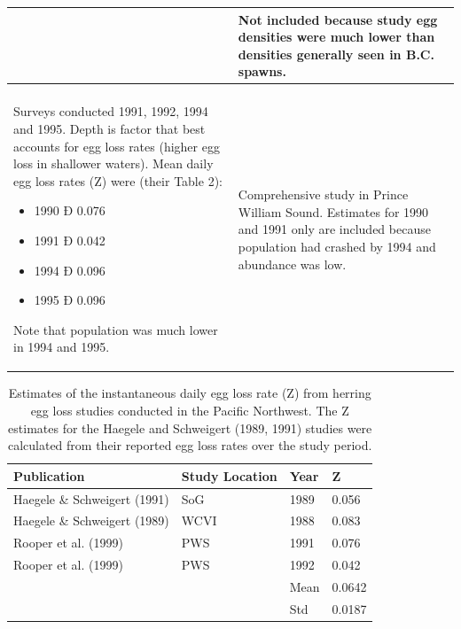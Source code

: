 \begin{table}[htdp]
\begin{center}
\begin{tabular}{|p{}|p{}|}
&
Not included because study egg densities were much lower than densities generally seen in B.C. spawns.\\
\hline
\cite{rooper1999habitat}& \\
Surveys conducted 1991, 1992, 1994 and 1995.  Depth is factor that best accounts for egg loss rates (higher egg loss in shallower waters).  Mean daily egg loss rates (Z) were (their Table 2):
\begin{itemize}
\item 1990 Ð 0.076
\item 1991 Ð 0.042
\item 1994 Ð 0.096
\item 1995 Ð 0.096 
\end{itemize}
Note that population was much lower in 1994 and 1995.
&
Comprehensive study in Prince William Sound.  Estimates for 1990 and 1991 only are included because population had crashed by 1994 and abundance was low.
\\
\hline
\end{tabular}
\end{center}
\label{AppendixC:Table3}
\end{table}



\begin{table}[htdp]
\caption{Estimates of the instantaneous daily egg loss rate (Z) from herring egg loss studies conducted in the Pacific Northwest. The Z estimates for the Haegele and Schweigert (1989, 1991) studies were calculated from their reported egg loss rates over the study period.}
\begin{center}
\begin{tabular}{llll}
\hline
Publication	&Study Location&	Year	&Z\\
\hline
Haegele \& Schweigert (1991) &	SoG &	1989	&0.056\\
Haegele \& Schweigert (1989)&WCVI&	1988&	0.083\\
Rooper et al. (1999)&	PWS	&1991	&0.076\\
Rooper et al. (1999)&	PWS	&1992	&0.042\\
\hline
& & Mean & 0.0642\\
& & Std & 0.0187\\
\hline
\end{tabular}
\end{center}
\label{AppendixC:Table4}
\end{table}%

